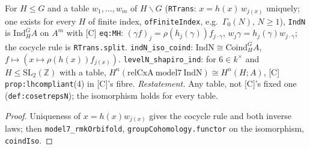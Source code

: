 \begin{definition}\label{def:levelellmodel-model}
  \leanok
  For $H\le G$ and a table $w_1,\dots,w_m$ of $H\backslash G$ (\texttt{RTrans}: $x=h(x)\,w_{j(x)}$ uniquely; one exists for every
  $H$ of finite index, \texttt{ofFiniteIndex}, e.g.\ $\Gamma_0(N)$, $N\ge1$), \texttt{IndN} is $\mathrm{Ind}_H^GA$ on $A^m$ with
  [C] \texttt{eq:MH}: $(\gamma f)_j=\rho(h_j(\gamma))f_{j\cdot\gamma}$, $w_j\gamma=h_j(\gamma)w_{j\cdot\gamma}$; the cocycle rule is
  \texttt{RTrans.split}. \texttt{indN\_iso\_coind}: $\mathrm{IndN}\cong\mathrm{Coind}_H^G A$, $f\mapsto(x\mapsto\rho(h(x))f_{j(x)})$.
  \texttt{levelN\_shapiro\_ind}: for $6\in k^\times$ and $H\le\mathrm{SL}_2(\mathbb Z)$ with a table,
  $H^n(\mathrm{relCxA}\ \mathrm{model7}\ \mathrm{IndN})\cong H^n(H;A)$, [C] \texttt{prop:lhcompliant}(4) in [C]'s fibre.
  \emph{Restatement.} Any table, not [C]'s fixed one (\texttt{def:cosetrepsN}); the isomorphism holds for every table.
\end{definition}
\begin{proof}
  \leanok
  Uniqueness of $x=h(x)w_{j(x)}$ gives the cocycle rule and both inverse laws; then \texttt{model7\_rmkOrbifold},
  \texttt{groupCohomology.functor} on the isomorphism, \texttt{coindIso}.
\end{proof}

